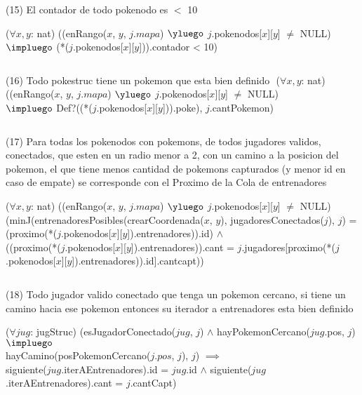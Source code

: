 \begin{Representacion}
$ $\newline

(15) El contador de todo pokenodo es $<$ 10 $ $\newline

($\forall x, y$: nat) ((enRango($x$, $y$, $j.mapa$) $\yluego$ $j$.pokenodos[$x$][$y$] $\neq$ NULL) \\
  $\impluego$ (*($j$.pokenodos[$x$][$y$])).contador < 10)

$ $\newline

(16) Todo pokestruc tiene un pokemon que esta bien definido $ $\newline
($\forall x, y$: nat) ((enRango($x$, $y$, $j.mapa$) $\yluego$ $j$.pokenodos[$x$][$y$] $\neq$ NULL) \\
  $\impluego$ Def?((*($j$.pokenodos[$x$][$y$])).poke), $j$.cantPokemon)

$ $\newline


(17) Para todas los pokenodos con pokemons, de todos jugadores validos, conectados, que esten en un radio menor a 2, con un camino a la posicion del pokemon, el que tiene menos cantidad de pokemons capturados (y menor id en caso de empate) se corresponde con el Proximo de la Cola de entrenadores $ $\newline

($\forall x, y$: nat) ((enRango($x$, $y$, $j.mapa$) $\yluego$ $j$.pokenodos[$x$][$y$] $\neq$ NULL) \\
  (minJ(entrenadoresPosibles(crearCoordenada($x$, $y$), jugadoresConectados($j$), $j$) = \\
  (proximo(*($j$.pokenodos[$x$][$y$]).entrenadores)).id) $\land$ \\
  ((proximo(*($j$.pokenodos[$x$][$y$]).entrenadores)).cant = $j$.jugadores[proximo(*($j$.pokenodos[$x$][$y$]).entrenadores)).id].cantcapt))
  
$ $\newline

(18) Todo jugador valido conectado que tenga un pokemon cercano, si tiene un camino hacia ese pokemon entonces su iterador a entrenadores esta bien definido $ $\newline

($\forall jug$: jugStruc) (esJugadorConectado($jug$, $j$) $\land$ hayPokemonCercano($jug$.pos, $j$) $\impluego$ \\
hayCamino(posPokemonCercano($j.pos$, $j$), $j$) $\implies$ \\
siguiente($jug$.iterAEntrenadores).id = $jug$.id $\land$ siguiente($jug$.iterAEntrenadores).cant = $j$.cantCapt) 


\end{Representacion}
